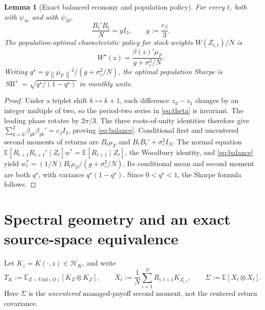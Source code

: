 \documentclass[11pt,a4paper]{article}
\newtheorem{lemma}[theorem]{Lemma}
\theoremstyle{remark}
\newcommand{\E}{\mathbb E}
\newcommand{\Hh}{\mathcal H_K}
\newcommand{\SR}{\operatorname{SR}}
\newcommand{\norm}[1]{\left\lVert#1\right\rVert}
\begin{document}
\begin{lemma}[Exact balanced economy and population policy]\label{lem:balance}
For every $t$, both with $\psi_\infty$ and with $\psi_M$,
\begin{equation}\label{eq:balance}
 \frac{B_t'B_t}{N}=g I_3,\qquad g:=\frac{c_\beta}{3}.
\end{equation}
The population-optimal characteristic policy for stock weights $W(Z_{i,t})/N$ is
\begin{equation}\label{eq:policy}
 W^\star(z)=\frac{\beta(z)'\mu_F}{g+\sigma_\varepsilon^2/N}.
\end{equation}
Writing $q^\star=g\norm{\mu_F}^2/(g+\sigma_\varepsilon^2/N)$, the optimal population Sharpe is
$\SR^\star=\sqrt{q^\star/(1-q^\star)}$ in monthly units.
\end{lemma}
\begin{proof}
Under a triplet shift $k\mapsto k+1$, each difference $z_d-z_1$ changes by an integer multiple of two, so the period-two series in \eqref{eq:theta} is invariant. The leading phase rotates by $2\pi/3$. The three roots-of-unity identities therefore give $\sum_{k=0}^2\beta_{gk}\beta_{gk}'=c_\beta I_3$, proving \eqref{eq:balance}. Conditional first and uncentered second moments of returns are $B_t\mu_F$ and $B_tB_t'+\sigma_\varepsilon^2 I_N$. The normal equation $\E[R_{t+1}R_{t+1}'\mid Z_t]w^*=\E[R_{t+1}\mid Z_t]$, the Woodbury identity, and \eqref{eq:balance} yield $w_t^*=(1/N)B_t\mu_F/(g+\sigma_\varepsilon^2/N)$. Its conditional mean and second moment are both $q^\star$, with variance $q^\star(1-q^\star)$. Since $0<q^\star<1$, the Sharpe formula follows.
\end{proof}

\section{Spectral geometry and an exact source-space equivalence}
Let $K_z=K(\cdot,z)\in\Hh$, and write
\begin{equation}
 T_K:=\E_{Z\sim\mathrm{Unif}(\Omega)}[K_Z\otimes K_Z],\qquad
 X_t:=\frac1N\sum_{i=1}^N R_{i,t+1}K_{Z_{i,t}},\qquad
 \Sigma:=\E[X_t\otimes X_t].
\end{equation}
Here $\Sigma$ is the \emph{uncentered} managed-payoff second moment, not the centered return covariance.
\end{document}

